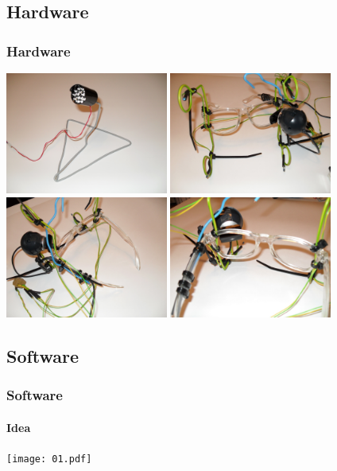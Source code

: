 \documentclass[%
14pt
]{beamer}
\begin{document}
\subsection{Hardware}
\begin{frame}
	\frametitle{Hardware}
  \vspace*{-0.5cm}
  \begin{center}
    \includegraphics[width=0.4\textwidth]{SDC11117.JPG}
    \includegraphics[width=0.4\textwidth]{SDC11119.JPG}\\
    \includegraphics[width=0.4\textwidth]{SDC11121.JPG}
    \includegraphics[width=0.4\textwidth]{SDC11122.JPG}
  \end{center}

\end{frame}

\subsection{Software}
\begin{frame}
	\frametitle{Software}
  \framesubtitle{Idea}
  \vspace*{-0.5cm}
  \begin{center}
    \texttt{[image: 01.pdf]}
  \end{center}

\end{frame}
\end{document}
